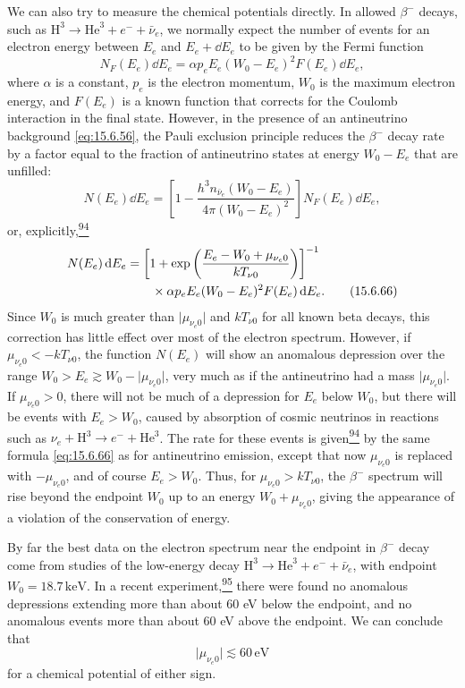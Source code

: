 We can also try to measure the chemical potentials directly. In allowed
\(\beta^-\) decays, such as
\(\mathrm H^3\to\mathrm{He}^3+e^-+\bar\nu_e\), we normally expect the number
of events for an electron energy between \(E_e\) and \(E_e+\dd E_e\) to be
given by the Fermi function
\[
  N_F(E_e)\dd E_e
  =
  \alpha p_eE_e(W_0-E_e)^2F(E_e)\dd E_e,
\]
where \(\alpha\) is a constant, \(p_e\) is the electron momentum, \(W_0\) is
the maximum electron energy, and \(F(E_e)\) is a known function that corrects
for the Coulomb interaction in the final state. However, in the presence of an
antineutrino background \eqref{eq:15.6.56}, the Pauli exclusion principle
reduces the \(\beta^-\) decay rate by a factor equal to the fraction of
antineutrino states at energy \(W_0-E_e\) that are unfilled:
\[
  N(E_e)\dd E_e
  =
  \left[
    1-\frac{h^3n_{\bar\nu_e}(W_0-E_e)}
    {4\pi(W_0-E_e)^2}
  \right]N_F(E_e)\dd E_e,
\]
or, explicitly,\hyperref[ch15-ref-94]{\textsuperscript{94}}
\begin{align}
  N(E_e)\mathop{}\!\mathrm{d} E_e
  &=
  \left[
    1+\exp\left(
      \frac{E_e-W_0+\mu_{\nu_e0}}{kT_{\nu0}}
    \right)
  \right]^{-1}
  \notag\\
  &\qquad\times
  \alpha p_eE_e(W_0-E_e)^2F(E_e)\mathop{}\!\mathrm{d} E_e.
  \tag{15.6.66}\label{eq:15.6.66}
\end{align}
Since \(W_0\) is much greater than \(\lvert\mu_{\nu_e0}\rvert\) and
\(kT_{\nu0}\) for all known beta decays, this correction has little effect
over most of the electron spectrum. However, if
\(\mu_{\nu_e0}<-kT_{\nu0}\), the function \(N(E_e)\) will show an anomalous
depression over the range
\(W_0>E_e\gtrsim W_0-\lvert\mu_{\nu_e0}\rvert\), very much as if the
antineutrino had a mass \(\lvert\mu_{\nu_e0}\rvert\). If
\(\mu_{\nu_e0}>0\), there will not be much of a depression for \(E_e\) below
\(W_0\), but there will be events with \(E_e>W_0\), caused by absorption of
cosmic neutrinos in reactions such as
\(\nu_e+\mathrm H^3\to e^-+\mathrm{He}^3\). The rate for these events is
given\hyperref[ch15-ref-94]{\textsuperscript{94}} by the same formula
\eqref{eq:15.6.66} as for antineutrino emission, except that now
\(\mu_{\nu_e0}\) is replaced with \(-\mu_{\nu_e0}\), and of course
\(E_e>W_0\). Thus, for \(\mu_{\nu_e0}>kT_{\nu0}\), the \(\beta^-\) spectrum
will rise beyond the endpoint \(W_0\) up to an energy
\(W_0+\mu_{\nu_e0}\), giving the appearance of a violation of the
conservation of energy.

By far the best data on the electron spectrum near the endpoint in
\(\beta^-\) decay come from studies of the low-energy decay
\(\mathrm H^3\to\mathrm{He}^3+e^-+\bar\nu_e\), with endpoint
\(W_0=18.7\,\mathrm{keV}\). In a recent
experiment,\hyperref[ch15-ref-95]{\textsuperscript{95}} there were found no
anomalous depressions extending more than about 60 eV below the endpoint, and
no anomalous events more than about 60 eV above the endpoint. We can conclude
that
\begin{equation}
  \lvert\mu_{\nu_e0}\rvert\lesssim60\,\mathrm{eV}
  \tag{15.6.67}\label{eq:15.6.67}
\end{equation}
for a chemical potential of either sign.

